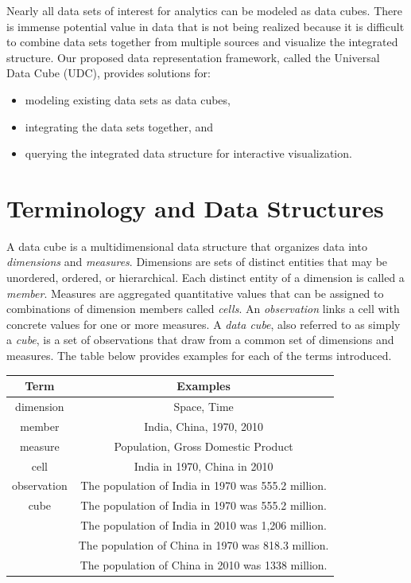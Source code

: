 Nearly all data sets of interest for analytics can be modeled as data cubes. There is immense potential value in data that is not being realized because it is difficult to combine data sets together from multiple sources and visualize the integrated structure. Our proposed data representation framework, called the Universal Data Cube (UDC), provides solutions for:
\begin{itemize}
\item modeling existing data sets as data cubes,
\item integrating the data sets together, and
\item querying the integrated data structure for interactive visualization.
\end{itemize}
\section{Terminology and Data Structures}
A data cube is a multidimensional data structure that organizes data into \emph{dimensions} and \emph{measures}. Dimensions are sets of distinct entities that may be unordered, ordered, or hierarchical. Each distinct entity of a dimension is called a \emph{member}. Measures are aggregated quantitative values that can be assigned to combinations of dimension members called \emph{cells}. An \emph{observation} links a cell with concrete values for one or more measures. A \emph{data cube}, also referred to as simply a \emph{cube}, is a set of observations that draw from a common set of dimensions and measures. The table below provides examples for each of the terms introduced.

\begin{center}
  \begin{tabular}{ | c | c | }
    \hline
    \textbf{Term} & \textbf{Examples} \\ \hline
    dimension & Space, Time \\ \hline
    member & India, China, 1970, 2010 \\ \hline
    measure & Population, Gross Domestic Product\\ \hline
    cell & India in 1970, China in 2010 \\ \hline
    observation & The population of India in 1970 was 555.2 million. \\ \hline
    cube & The population of India in 1970 was 555.2 million. \\
         & The population of India in 2010 was 1,206 million. \\
         & The population of China in 1970 was 818.3 million. \\
         & The population of China in 2010 was 1338 million. \\ \hline
  \end{tabular}
\end{center}

